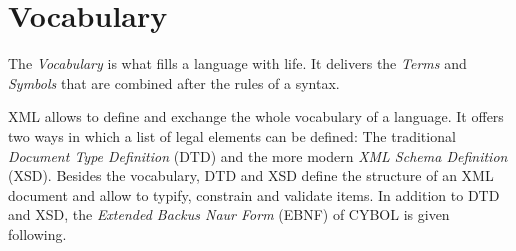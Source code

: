 %
%
%
%
%
%

\section{Vocabulary}
\label{vocabulary_heading}

The \emph{Vocabulary} is what fills a language with life. It delivers the
\emph{Terms} and \emph{Symbols} that are combined after the rules of a syntax.

XML allows to define and exchange the whole vocabulary of a language. It offers
two ways in which a list of legal elements can be defined: The traditional
\emph{Document Type Definition} (DTD) and the more modern
\emph{XML Schema Definition} (XSD). Besides the vocabulary, DTD and XSD define
the structure of an XML document and allow to typify, constrain and validate
items. In addition to DTD and XSD, the \emph{Extended Backus Naur Form} (EBNF)
of CYBOL is given following.




\clearpage
